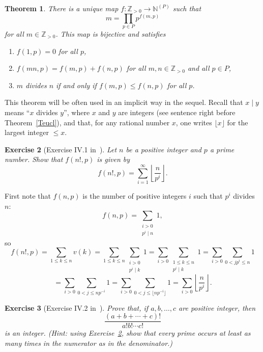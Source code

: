 \documentclass[12pt,letterpaper]{article}
\newcommand{\N}{\mathbb{N}}
\newcommand{\Z}{\mathbb{Z}}
\newtheorem{thm}{Theorem}%
\newtheorem{exer}[thm]{Exercise}
\theoremstyle{definition}
\begin{document}
\begin{thm}\label{Tpdri}
There is a unique map $f:\Z_{>0}\to\N^{(P)}$ such that 
\begin{equation}\label{Eqpdri}
m=\prod_{p\in P}p^{f(m,p)}
\end{equation} 
for all $m\in\Z_{>0}$. This map is bijective and satisfies 
\begin{enumerate}
\item $f(1,p)=0$ for all $p$, 
\item $f(mn,p)=f(m,p)+f(n,p)$ for all $m,n\in\Z_{>0}$ and all $p\in P$, 
\item $m$ divides $n$ if and only if $f(m,p)\le f(n,p)$ for all $p$. 
\end{enumerate}
\end{thm}

This theorem will be often used in an implicit way in the sequel. Recall that $x\mid y$ means ``$x$ divides $y$'', where $x$ and $y$ are integers (see sentence right before Theorem~\ref{Teucl}), and that, for any rational number $x$, one writes $\lfloor x\rfloor$ for the largest integer $\le x$. 

\begin{exer}[Exercise IV.1 in~\cite{weil1979}]\label{ExIV1} 
Let $n$ be a positive integer and $p$ a prime number. Show that $f(n!,p)$ is given by 
$$
f(n!,p)=\sum_{i=1}^\infty\left\lfloor\frac{n}{p^i}\right\rfloor.
$$
\end{exer} 

First note that $f(n,p)$ is the number of positive integers $i$ such that $p^i$ divides $n$: 
$$
f(n,p)=\sum_{\substack{i>0 \\ p^i\mid n}} 1,
$$ 
so 
$$
f(n!,p)=\sum_{1\le k\le n} v(k) = \sum_{1\le k\le n} \sum_{\substack{i>0 \\ p^i\mid k}} 1 = \sum_{i>0} \sum_{\substack{1\le k\le n \\ p^i\mid k}} 1 = \sum_{i>0} \sum_{0<jp^i\le n} 1
$$ 
$$
= \sum_{i>0} \sum_{0<j\le np^{-i}} 1 
= \sum_{i>0} \sum_{0<j\le\lfloor np^{-i}\rfloor} 1 
= \sum_{i>0} \left\lfloor\frac{n}{p^i}\right\rfloor.
$$ 

\begin{exer}[Exercise IV.2 in~\cite{weil1979}]\label{Ex7} 
Prove that, if $a,b,\ldots,c$ are positive integer, then 
$$
\frac{(a+b+\cdots+c)!}{a!b!\cdots c!}
$$ 
is an integer. (Hint: using Exercise~\ref{ExIV1}, show that every prime occurs at least as many times in the numerator as in the denominator.) 
\end{exer} 
\end{document}
